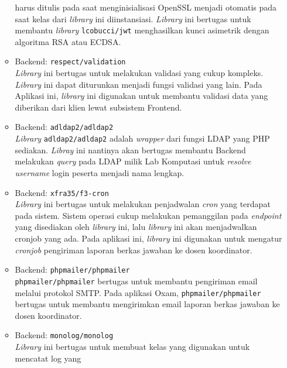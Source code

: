 \begin{itemize}
\begin{itemize}
                    harus ditulis pada saat menginisialisasi OpenSSL menjadi otomatis pada saat kelas dari 
                    \textit{library} ini diinstansiasi.
                    \textit{Library} ini bertugas untuk membantu \textit{library} \texttt{lcobucci/jwt} menghasilkan kunci
                    asimetrik dengan algoritma RSA atau ECDSA. 
                \item Backend: \texttt{respect/validation} \\
                    \textit{Library} ini bertugas untuk melakukan validasi yang cukup kompleks. \textit{Library}
                    ini dapat diturunkan menjadi fungsi validasi yang lain. Pada Aplikasi ini, \textit{library} ini
                    digunakan untuk membantu validasi data yang diberikan dari klien lewat subsistem
                    Frontend.
                \item Backend: \texttt{adldap2/adldap2} \\
                    \textit{Library} \texttt{adldap2/adldap2} adalah \textit{wrapper} dari fungsi LDAP yang PHP sediakan.
                    \textit{Libray} ini nantinya akan bertugas membantu Backend melakukan \textit{query} 
                    pada LDAP milik Lab Komputasi untuk \textit{resolve} \textit{username} login peserta
                    menjadi nama lengkap.
                \item Backend: \texttt{xfra35/f3-cron} \\
                    \textit{Library} ini bertugas untuk melakukan penjadwalan \textit{cron} yang terdapat
                    pada sistem. Sistem operasi cukup melakukan pemanggilan pada \textit{endpoint} yang disediakan
                    oleh \textit{library} ini, lalu \textit{library} ini akan menjadwalkan cronjob yang ada.
                    Pada aplikasi ini, \textit{library} ini digunakan untuk mengatur \textit{cronjob} pengiriman
                    laporan berkas jawaban ke dosen koordinator.
                \item Backend: \texttt{phpmailer/phpmailer} \\
                    \texttt{phpmailer/phpmailer} bertugas untuk membantu pengiriman email melalui protokol SMTP.
                    Pada aplikasi Oxam, \texttt{phpmailer/phpmailer} bertugas untuk membantu mengirimkan email
                    laporan berkas jawaban ke dosen koordinator.
                \item Backend: \texttt{monolog/monolog} \\
                    \textit{Library} ini bertugas untuk membuat kelas yang digunakan untuk mencatat log yang

\end{itemize}
\end{itemize}
